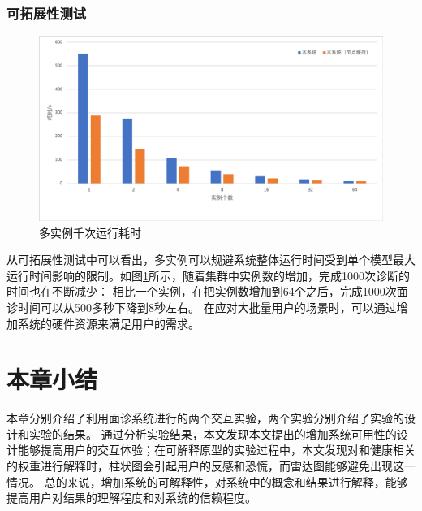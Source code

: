 \subsubsection{可拓展性测试}

\begin{figure}[h]
    \centering
    \includegraphics[width=12cm]{images/minstances.png}
    \caption{多实例千次运行耗时}
    \label{fig:minstantces}
\end{figure}


从可拓展性测试中可以看出，多实例可以规避系统整体运行时间受到单个模型最大运行时间影响的限制。如图\ref{fig:minstantces}所示，随着集群中实例数的增加，完成1000次诊断的时间也在不断减少：
相比一个实例，在把实例数增加到64个之后，完成1000次面诊时间可以从500多秒下降到8秒左右。
在应对大批量用户的场景时，可以通过增加系统的硬件资源来满足用户的需求。




\section{本章小结}

本章分别介绍了利用面诊系统进行的两个交互实验，两个实验分别介绍了实验的设计和实验的结果。
通过分析实验结果，本文发现本文提出的增加系统可用性的设计能够提高用户的交互体验；在可解释原型的实验过程中，本文发现对和健康相关的权重进行解释时，柱状图会引起用户的反感和恐慌，而雷达图能够避免出现这一情况。
总的来说，增加系统的可解释性，对系统中的概念和结果进行解释，能够提高用户对结果的理解程度和对系统的信赖程度。


